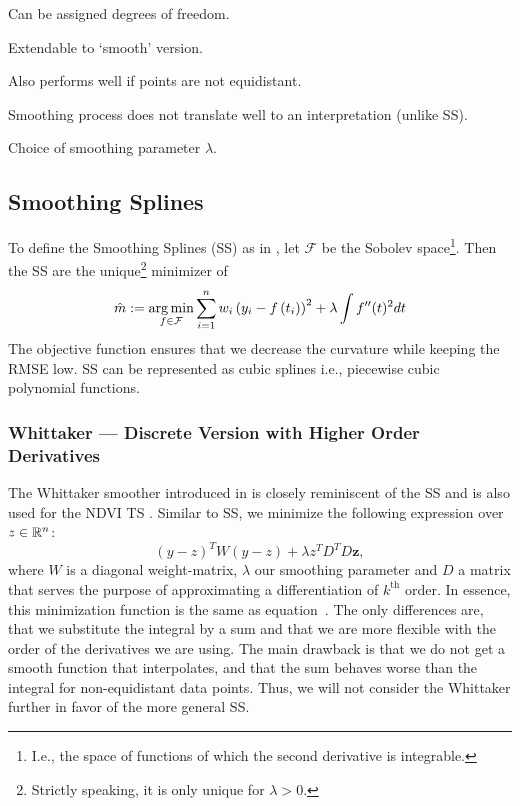 		\begin{my_pros_cons_table}{
				\item Can be assigned degrees of freedom.
				\item Extendable to `smooth' version.
				\item Also performs well if points are not equidistant.
			}{
				\item Smoothing process does not translate well to an interpretation (unlike SS).
				\item Choice of smoothing parameter $\lambda$.
			}
		\end{my_pros_cons_table}


	\subsection{Smoothing Splines}
		\label{sec:Natural_SS}
		To define the Smoothing Splines (SS) as in \cite{cravenSmoothingNoisyData1978}, let $\mathcal F$ be the Sobolev space\footnote{I.e., the space of functions of which the second derivative is integrable.}. Then the SS are the unique\footnote{Strictly speaking, it is only unique for $\lambda > 0$.} minimizer of
		\begin{equation}
			\label{eq:ss}
			\hat m :=\operatorname*{arg\, min}_{f \in \mathcal F} \sum_{i=1}^{n}w_i\left(y_{i}-{f}\left(t_{i}\right)\right)^{2}+\lambda \int {f}^{\prime \prime}(t)^{2} dt
		\end{equation}
		 The objective function ensures that we decrease the curvature while keeping the RMSE low.
		SS can be represented as cubic splines i.e., piecewise cubic polynomial functions.

		\subsubsection{Whittaker --- Discrete Version with Higher Order Derivatives}
			The Whittaker smoother introduced in \cite{eilersPerfectSmoother2003} is closely reminiscent of the SS and is also used for the NDVI TS \citep{atzbergerTimeSeriesMonitoring2011}. Similar to SS, we minimize the following expression over $z\in \mathbb{R}^n$:
			$$
			({y}-{z})^{{T}} {W}({y}-{z})+\lambda {z}^{{T}} {D}^{{T}} {D} \mathbf{z},
			$$
			where $W$ is a diagonal weight-matrix, $\lambda$ our smoothing parameter and $D$ a matrix that serves the purpose of approximating a differentiation of $k^\text{th}$ order. In essence, this minimization function is the same as equation~. The only differences are, that we substitute the integral by a sum and that we are more flexible with the order of the derivatives we are using. The main drawback is that we do not get a smooth function that interpolates, and that the sum behaves worse than the integral for non-equidistant data points. Thus, we will not consider the Whittaker further in favor of the more general SS. 

